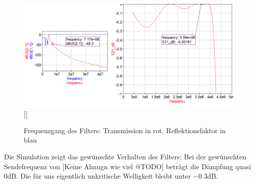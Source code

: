 \begin{figure}[H]
    \includegraphics[scale=0.6]{res/TP_Simulation.png}[]
    \caption{Frequenzgang des Filters: Transmission in rot, Reflektionsfaktor in blau}
\end{figure}
Die Simulation zeigt das gewünschte Verhalten des Filters: Bei der gewünschten
Sendefrequenz von [Keine Ahnugn wie viel @TODO] beträgt die Dämpfung quasi $0$dB.
Die für uns eigentlich unkritische Welligkeit bleibt unter $-0.3$dB.